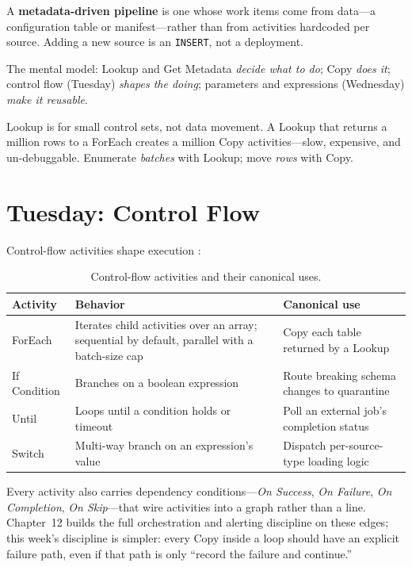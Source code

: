 \begin{definitionbox}
A \textbf{metadata-driven pipeline} is one whose work items come from data---a configuration table or manifest---rather than from activities hardcoded per source. Adding a new source is an \texttt{INSERT}, not a deployment.
\end{definitionbox}

The mental model: Lookup and Get Metadata \emph{decide what to do}; Copy \emph{does it}; control flow (Tuesday) \emph{shapes the doing}; parameters and expressions (Wednesday) \emph{make it reusable}.

\begin{pitfall}
Lookup is for small control sets, not data movement. A Lookup that returns a million rows to a ForEach creates a million Copy activities---slow, expensive, and un-debuggable. Enumerate \emph{batches} with Lookup; move \emph{rows} with Copy.
\end{pitfall}

\section{Tuesday: Control Flow}
Control-flow activities shape execution \cite{microsoftFabricPipelines}:

\begin{table}[H]
\centering
\small
\begin{tabular}{@{}p{2.8cm}p{5.6cm}p{5.4cm}@{}}
\toprule
\textbf{Activity} & \textbf{Behavior} & \textbf{Canonical use} \\
\midrule
ForEach & Iterates child activities over an array; sequential by default, parallel with a batch-size cap & Copy each table returned by a Lookup \\
If Condition & Branches on a boolean expression & Route breaking schema changes to quarantine \\
Until & Loops until a condition holds or timeout & Poll an external job's completion status \\
Switch & Multi-way branch on an expression's value & Dispatch per-source-type loading logic \\
\bottomrule
\end{tabular}
\caption{Control-flow activities and their canonical uses.}
\label{tab:chapter9-control-flow}
\end{table}

Every activity also carries dependency conditions---\emph{On Success}, \emph{On Failure}, \emph{On Completion}, \emph{On Skip}---that wire activities into a graph rather than a line. Chapter~12 builds the full orchestration and alerting discipline on these edges; this week's discipline is simpler: every Copy inside a loop should have an explicit failure path, even if that path is only ``record the failure and continue.''

